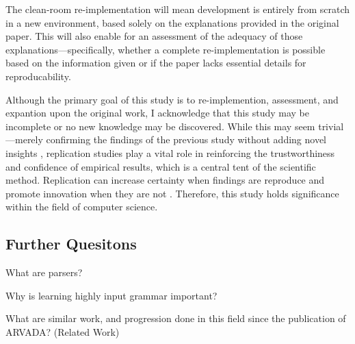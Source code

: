 \vspace{\baselineskip}
The clean-room re-implementation will mean development is entirely from scratch in a new environment, based solely on the explanations provided in the original paper. This will also enable for an assessment of the adequacy of those explanations—specifically, whether a complete re-implementation is possible based on the information given or if the paper lacks essential details for reproducability.

\vspace{\baselineskip}
Although the primary goal of this study is to re-implemention, assessment, and expantion upon the original work, I acknowledge that this study may be incomplete or no new knowledge may be discovered. While this may seem trivial—merely confirming the findings of the previous study without adding novel insights \cite{hendriksConsiderItParsed}, replication studies play a vital role in reinforcing the trustworthiness and confidence of empirical results, which is a central tent of the scientific method. Replication can increase certainty when findings are reproduce and promote innovation when they are not \cite{shepperdReplicationStudiesConsidered2018}. Therefore, this study holds significance within the field of computer science.

\subsection{Further Quesitons}

What are parsers?

Why is learning highly input grammar important?

What are similar work, and progression done in this field since the publication of ARVADA? (Related Work)



